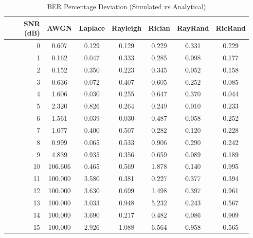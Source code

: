 \begin{table}[htbp]
\centering
\caption{BER Percentage Deviation (Simulated vs Analytical)}
\label{tab:ber_dev}
\begin{tabular}{rcccccc}
\toprule
SNR (dB) & AWGN & Laplace & Rayleigh & Rician & RayRand & RicRand \\
\midrule
0 & 0.607 & 0.129 & 0.129 & 0.229 & 0.331 & 0.229 \\
1 & 0.162 & 0.047 & 0.333 & 0.285 & 0.098 & 0.177 \\
2 & 0.152 & 0.350 & 0.223 & 0.345 & 0.052 & 0.158 \\
3 & 0.636 & 0.072 & 0.407 & 0.605 & 0.252 & 0.085 \\
4 & 1.606 & 0.030 & 0.255 & 0.647 & 0.370 & 0.044 \\
5 & 2.320 & 0.826 & 0.264 & 0.249 & 0.010 & 0.233 \\
6 & 1.561 & 0.039 & 0.030 & 0.487 & 0.058 & 0.252 \\
7 & 1.077 & 0.400 & 0.507 & 0.282 & 0.120 & 0.228 \\
8 & 0.999 & 0.065 & 0.533 & 0.906 & 0.290 & 0.242 \\
9 & 4.839 & 0.935 & 0.356 & 0.659 & 0.089 & 0.189 \\
10 & 106.606 & 0.465 & 0.569 & 1.878 & 0.140 & 0.995 \\
11 & 100.000 & 3.580 & 0.381 & 0.227 & 0.377 & 0.394 \\
12 & 100.000 & 3.630 & 0.699 & 1.498 & 0.397 & 0.961 \\
13 & 100.000 & 3.033 & 0.948 & 5.232 & 0.243 & 0.567 \\
14 & 100.000 & 3.690 & 0.217 & 0.482 & 0.086 & 0.909 \\
15 & 100.000 & 2.926 & 1.088 & 6.564 & 0.958 & 0.565 \\
\bottomrule
\end{tabular}
\end{table}

